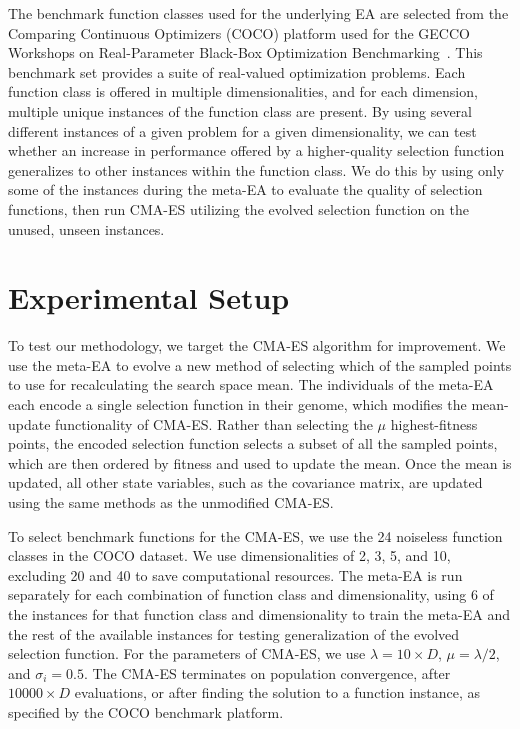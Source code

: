 \documentclass[sigconf]{acmart}
\begin{document}
The benchmark function classes used for the underlying EA are selected from the Comparing Continuous Optimizers (COCO) platform used for the GECCO Workshops on Real-Parameter Black-Box Optimization Benchmarking~\citep{cocobbob}. This benchmark set provides a suite of real-valued optimization problems. Each function class is offered in multiple dimensionalities, and for each dimension, multiple unique instances of the function class are present. By using several different instances of a given problem for a given dimensionality, we can test whether an increase in performance offered by a higher-quality selection function generalizes to other instances within the function class. We do this by using only some of the instances during the meta-EA to evaluate the quality of selection functions, then run CMA-ES utilizing the evolved selection function on the unused, unseen instances.

\section{Experimental Setup}
\label{Primary Experiments}
To test our methodology, we target the CMA-ES algorithm for improvement. We use the meta-EA to evolve a new method of selecting which of the sampled points to use for recalculating the search space mean. The individuals of the meta-EA each encode a single selection function in their genome, which modifies the mean-update functionality of CMA-ES. Rather than selecting the $\mu$ highest-fitness points, the encoded selection function selects a subset of all the sampled points, which are then ordered by fitness and used to update the mean. Once the mean is updated, all other state variables, such as the covariance matrix, are updated using the same methods as the unmodified CMA-ES.

To select benchmark functions for the CMA-ES, we use the 24 noiseless function classes in the COCO dataset. We use dimensionalities of 2, 3, 5, and 10, excluding 20 and 40 to save computational resources. The meta-EA is run separately for each combination of function class and dimensionality, using 6 of the instances for that function class and dimensionality to train the meta-EA and the rest of the available instances for testing generalization of the evolved selection function. For the parameters of CMA-ES, we use $\lambda=10 \times D$, $\mu = \lambda/2$, and $\sigma_i = 0.5$. The CMA-ES terminates on population convergence, after $10000 \times D$ evaluations, or after finding the solution to a function instance, as specified by the COCO benchmark platform.
\end{document}
